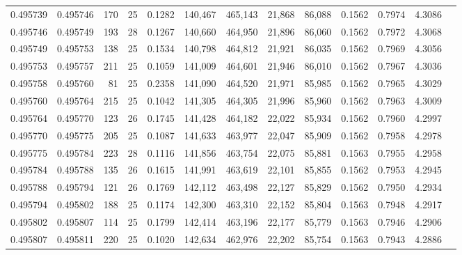 \begin{tabular}{rrrrrrrrrrrrr}
0.495739 & 0.495746 & 170 &  25 &                                     0.1282 & 140,467 & 465,143 &  21,868 &  86,088 & 0.1562 & 0.7974 & 4.3086 \\
0.495746 & 0.495749 & 193 &  28 &                                     0.1267 & 140,660 & 464,950 &  21,896 &  86,060 & 0.1562 & 0.7972 & 4.3068 \\
0.495749 & 0.495753 & 138 &  25 &                                     0.1534 & 140,798 & 464,812 &  21,921 &  86,035 & 0.1562 & 0.7969 & 4.3056 \\
0.495753 & 0.495757 & 211 &  25 &                                     0.1059 & 141,009 & 464,601 &  21,946 &  86,010 & 0.1562 & 0.7967 & 4.3036 \\
0.495758 & 0.495760 &  81 &  25 &                                     0.2358 & 141,090 & 464,520 &  21,971 &  85,985 & 0.1562 & 0.7965 & 4.3029 \\
0.495760 & 0.495764 & 215 &  25 &                                     0.1042 & 141,305 & 464,305 &  21,996 &  85,960 & 0.1562 & 0.7963 & 4.3009 \\
0.495764 & 0.495770 & 123 &  26 &                                     0.1745 & 141,428 & 464,182 &  22,022 &  85,934 & 0.1562 & 0.7960 & 4.2997 \\
0.495770 & 0.495775 & 205 &  25 &                                     0.1087 & 141,633 & 463,977 &  22,047 &  85,909 & 0.1562 & 0.7958 & 4.2978 \\
0.495775 & 0.495784 & 223 &  28 &                                     0.1116 & 141,856 & 463,754 &  22,075 &  85,881 & 0.1563 & 0.7955 & 4.2958 \\
0.495784 & 0.495788 & 135 &  26 &                                     0.1615 & 141,991 & 463,619 &  22,101 &  85,855 & 0.1562 & 0.7953 & 4.2945 \\
0.495788 & 0.495794 & 121 &  26 &                                     0.1769 & 142,112 & 463,498 &  22,127 &  85,829 & 0.1562 & 0.7950 & 4.2934 \\
0.495794 & 0.495802 & 188 &  25 &                                     0.1174 & 142,300 & 463,310 &  22,152 &  85,804 & 0.1563 & 0.7948 & 4.2917 \\
0.495802 & 0.495807 & 114 &  25 &                                     0.1799 & 142,414 & 463,196 &  22,177 &  85,779 & 0.1563 & 0.7946 & 4.2906 \\
0.495807 & 0.495811 & 220 &  25 &                                     0.1020 & 142,634 & 462,976 &  22,202 &  85,754 & 0.1563 & 0.7943 & 4.2886 \\

\end{tabular}
